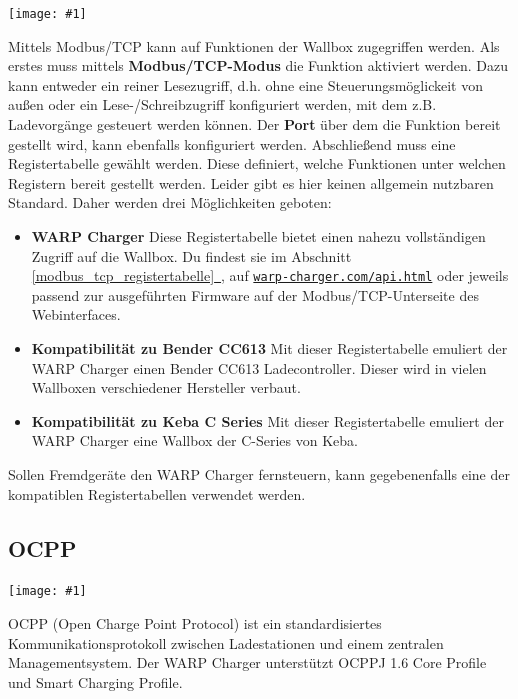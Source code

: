 \documentclass[a4paper,10pt]{article}
\newcommand{\gfx}[1]{\texttt{[image: \#1]}}
\newcommand*{\fullref}[1]{Abschnitt \hyperref[{#1}]{\ref*{#1}~\nameref*{#1}}}
\newcommand\rurl[2]{%
  \href{#1}{\nolinkurl{#2}}%
}
\begin{document}
\begin{multicols*}{2}
    \gfx{./img_warp2/resized/web_modbus_tcp}

    Mittels Modbus/TCP kann auf Funktionen der Wallbox zugegriffen werden.
    Als erstes muss mittels \textbf{Modbus/TCP-Modus} die Funktion aktiviert
    werden. Dazu kann entweder ein reiner Lesezugriff, d.h. ohne eine
    Steuerungsmöglickeit von außen oder ein Lese-/Schreibzugriff
    konfiguriert werden, mit dem z.B. Ladevorgänge gesteuert werden können.
    Der \textbf{Port} über dem die Funktion bereit gestellt
    wird, kann ebenfalls konfiguriert werden. Abschließend muss eine
    Registertabelle gewählt werden. Diese definiert, welche Funktionen unter
    welchen Registern bereit gestellt werden. Leider gibt es hier keinen
    allgemein nutzbaren Standard. Daher werden drei Möglichkeiten geboten:

    \begin{itemize}
        \item \textbf{WARP Charger} Diese Registertabelle bietet einen nahezu vollständigen Zugriff auf die Wallbox.
                Du findest sie im \fullref{modbus_tcp_registertabelle}, auf \rurl{https://warp-charger.com/api.html}{warp-charger.com/api.html} oder
                jeweils passend zur ausgeführten Firmware auf der Modbus/TCP-Unterseite des Webinterfaces.
        \item \textbf{Kompatibilität zu Bender CC613} Mit dieser Registertabelle emuliert der WARP Charger einen Bender CC613 Ladecontroller. Dieser wird in vielen Wallboxen verschiedener Hersteller verbaut.
        \item \textbf{Kompatibilität zu Keba C Series} Mit dieser Registertabelle emuliert der WARP Charger eine Wallbox der C-Series von Keba.
    \end{itemize}

    Sollen Fremdgeräte den WARP Charger fernsteuern, kann gegebenenfalls eine der
    kompatiblen Registertabellen verwendet werden.

    \subsection{OCPP}

    \gfx{./img_warp2/resized/web_ocpp}

    OCPP (Open Charge Point Protocol) ist ein standardisiertes Kommunikationsprotokoll zwischen
    Ladestationen und einem zentralen Managementsystem. Der WARP Charger
    unterstützt OCPPJ 1.6 Core Profile und Smart Charging Profile.


\end{multicols*}
\end{document}
